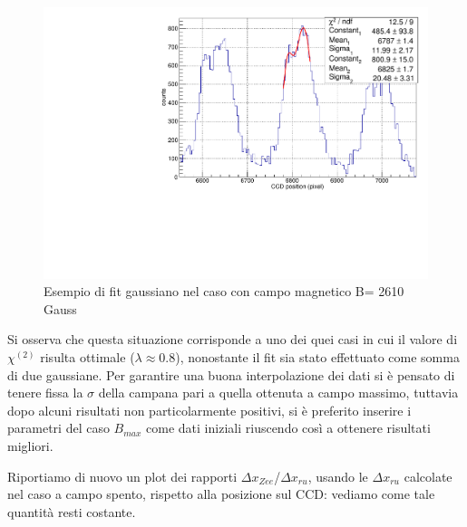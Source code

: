 \documentclass{article}
\begin{document}
	
	\begin{center}
	\begin{figure}[H]
		\centering
		\includegraphics[scale=0.38, angle=0]{campomin/singolo.pdf}
        \setlength{\belowcaptionskip}{-20pt}
		\caption{ Esempio di fit gaussiano nel caso con campo magnetico B= 2610 Gauss}
		\label{fig:singoloBonMin}
	\end{figure}
	\end{center}

	Si osserva che questa situazione corrisponde a uno dei quei casi in cui il valore di
	$\chi^{(2)}$ risulta ottimale ($\lambda\approx 0.8$), nonostante il fit sia stato effettuato
	come somma di due gaussiane.
	Per garantire una buona interpolazione dei dati si è pensato di tenere fissa la $\sigma$
	della campana pari a quella ottenuta a campo massimo, tuttavia dopo alcuni risultati non
	particolarmente positivi, si è preferito inserire i parametri del caso $B_{max}$ come
	dati iniziali riuscendo così a ottenere risultati migliori.
	
	Riportiamo di nuovo un plot dei rapporti $\Delta x_{Zee}$/$\Delta x_{ru}$, usando le $\Delta x_{ru}$
	calcolate nel caso a campo spento, rispetto alla posizione sul CCD: vediamo come tale quantità resti 
	costante.
\end{document}
